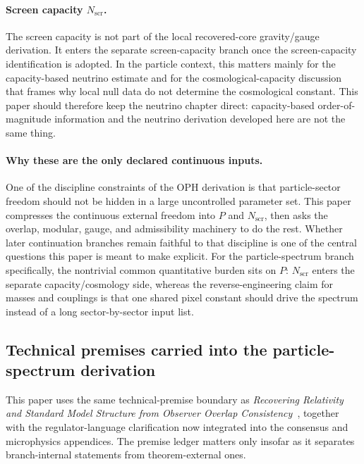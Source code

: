\documentclass[11pt]{article}
\begin{document}
\paragraph{Screen capacity \(N_{\mathrm{scr}}\).}
The screen capacity is not part of the local recovered-core gravity/gauge derivation. It enters
the separate screen-capacity branch once the screen-capacity identification is adopted. In the
particle context, this matters mainly for the capacity-based neutrino estimate and for the
cosmological-capacity discussion that frames why local null data do not determine the
cosmological constant. This paper should therefore keep the neutrino chapter direct:
capacity-based order-of-magnitude information and the neutrino derivation developed here are not the
same thing.

\paragraph{Why these are the only declared continuous inputs.}
One of the discipline constraints of the OPH derivation is that particle-sector freedom should not
be hidden in a large uncontrolled parameter set. This paper compresses the
continuous external freedom into \(P\) and \(N_{\mathrm{scr}}\), then asks the overlap,
modular, gauge, and admissibility machinery to do the rest. Whether later continuation branches
remain faithful to that discipline is one of the central questions this paper is meant to
make explicit. For the particle-spectrum branch specifically, the nontrivial common quantitative
burden sits on \(P\): \(N_{\mathrm{scr}}\) enters the separate capacity/cosmology side, whereas
the reverse-engineering claim for masses and couplings is that one shared pixel constant should
drive the spectrum instead of a long sector-by-sector input list.

\subsection{Technical premises carried into the particle-spectrum derivation}

This paper uses the same technical-premise boundary as
\emph{Recovering Relativity and Standard Model Structure from Observer Overlap Consistency}~\cite{ophcompact}, together with
the regulator-language clarification now integrated into the consensus and microphysics
appendices. The premise ledger matters only
insofar as it separates branch-internal statements from theorem-external ones.
\end{document}
